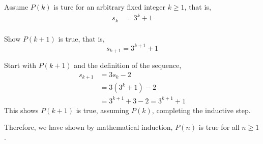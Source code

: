 \begin{questions}
\begin{solution}
  Assume $P(k)$ is ture for an arbitrary fixed integer $k \geq 1$, that is, 
  \begin{align*}
    s_k &= 3^k + 1 \tag{IH} \\
  \end{align*}

  Show $P(k+1)$ is true, that is,
  \[ s_{k+1} = 3^{k+1} + 1 \]

  Start with $P(k+1)$ and the definition of the sequence, 
  \begin{align*}
    s_{k+1} &= 3s_{k} - 2 \\
    &= 3(3^k + 1) - 2 \tag{IH}\\
    &= 3^{k+1} + 3 - 2 = 3^{k+1} + 1
  \end{align*}
  This shows $P(k+1)$ is true, assuming $P(k)$, completing the inductive step.

  \smallskip
  Therefore, we have shown by mathematical induction, $P(n)$ is true for all $n \geq 1$.
\end{solution}


\end{questions}

